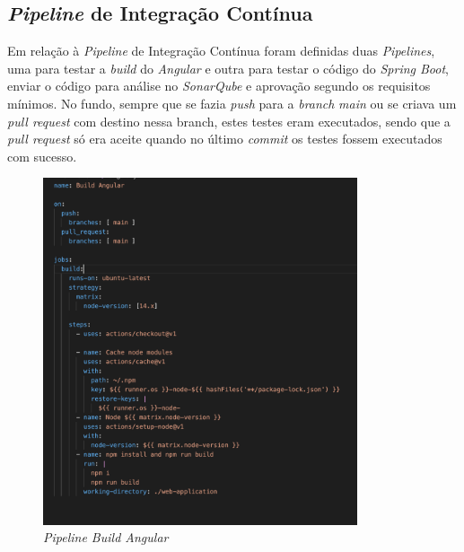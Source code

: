 \documentclass[10pt,english]{article}
\begin{document}
\clearpage

\subsection{\textit{Pipeline} de Integração Contínua}

\par Em relação à \textit{Pipeline} de Integração Contínua foram definidas duas \textit{Pipelines}, uma para testar a \textit{build} do \textit{Angular} e outra para testar o código do \textit{Spring Boot}, enviar o código para análise no \textit{SonarQube} e aprovação segundo os requisitos mínimos. No fundo, sempre que se fazia \textit{push} para a \textit{branch} \textit{main} ou se criava um \textit{pull request} com destino nessa branch, estes testes eram executados, sendo que a \textit{pull request} só era aceite quando no último \textit{commit} os testes fossem executados com sucesso.

\begin{figure}[h]
    \centering
    \includegraphics[width=350]{images/pipeline-build-angular.png}
    \caption{\textit{Pipeline Build Angular}}
\end{figure}

\clearpage
\end{document}
